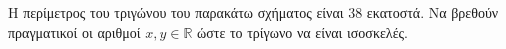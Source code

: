 Η περίμετρος του τριγώνου του παρακάτω σχήματος είναι $ 38 $ εκατοστά. Να βρεθούν πραγματικοί οι αριθμοί $ x, y\in\mathbb{R} $ ώστε το τρίγωνο να είναι ισοσκελές.
\vspace{-5mm}
\begin{center}
\end{center}
